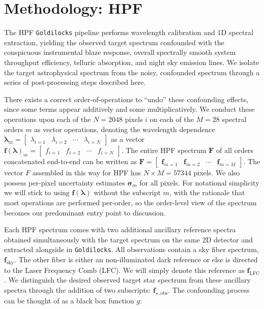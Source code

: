 \documentclass[modern]{aastex631}
\begin{document}
\section{Methodology: HPF}
\label{methods-details}
The HPF \texttt{Goldilocks} pipeline performs wavelength calibration and 1D spectral extraction, yielding the observed target spectrum confounded with the conspicuous instrumental blaze response, overall spectrally smooth system throughput efficiency, telluric absorption, and night sky emission lines.  We isolate the target astrophysical spectrum from the noisy, confounded spectrum through a series of post-processing steps described here.  

There exists a correct order-of-operations to ``undo'' these confounding effects, since some terms appear additively and some multiplicatively.  We conduct these operations upon each of the $N=2048$ pixels $i$ on each of the $M=28$ spectral orders $m$ as vector operations, denoting the wavelength dependence $\boldsymbol{\lambda}_m = \begin{bmatrix}\lambda_{i=1} & \lambda_{i=2} & \cdots & \lambda_{i=N} \end{bmatrix}$ as a vector $\mathbf{f(\boldsymbol{\lambda})}_{m} = \begin{bmatrix}f_{i=1} & f_{i=2} & \cdots & f_{i=N} \end{bmatrix}$.  The entire HPF spectrum $\mathbf{F}$ of all orders concatenated end-to-end can be written as $\mathbf{F} = \begin{bmatrix} \mathbf{f}_{m=1} & \mathbf{f}_{m=2} & \cdots & \mathbf{f}_{m=M} \end{bmatrix}$.  The vector $F$ assembled in this way for HPF has $N\times M=57344$ pixels.  We also possess per-pixel uncertainty estimates $\boldsymbol{\sigma}_m$ for all pixels.  For notational simplicity we will stick to using $\mathbf{f(\boldsymbol{\lambda})}$ without the subscript $m$, with the rationale that most operations are performed per-order, so the order-level view of the spectrum becomes our predominant entry point to discussion.  

Each HPF spectrum comes with two additional ancillary reference spectra obtained simultaneously with the target spectrum on the same 2D detector and extracted alongside in \texttt{Goldilocks}.  All observations contain a sky fiber spectrum, $\mathbf{f}_{\mathrm{sky}}$.  The other fiber is either an non-illuminated dark reference or else is directed to the Laser Frequency Comb (LFC).  We will simply denote this reference as $\mathbf{f}_{\mathrm{LFC}}$.  We distinguish the desired observed target star spectrum from these ancillary spectra through the addition of two subscripts: $\mathbf{f}_{\star,\mathrm{obs}}$.  The confounding process can be thought of as a black box function $g$:
\end{document}

